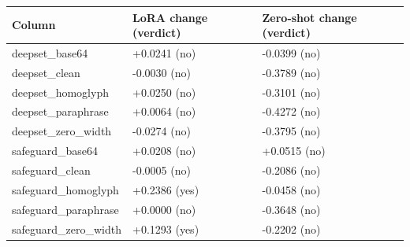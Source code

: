 \begin{tabular}{lll}
\toprule
Column & LoRA change (verdict) & Zero-shot change (verdict)\\
\midrule
deepset\_base64 & +0.0241 (no) & -0.0399 (no)\\
deepset\_clean & -0.0030 (no) & -0.3789 (no)\\
deepset\_homoglyph & +0.0250 (no) & -0.3101 (no)\\
deepset\_paraphrase & +0.0064 (no) & -0.4272 (no)\\
deepset\_zero\_width & -0.0274 (no) & -0.3795 (no)\\
safeguard\_base64 & +0.0208 (no) & +0.0515 (no)\\
safeguard\_clean & -0.0005 (no) & -0.2086 (no)\\
safeguard\_homoglyph & +0.2386 (yes) & -0.0458 (no)\\
safeguard\_paraphrase & +0.0000 (no) & -0.3648 (no)\\
safeguard\_zero\_width & +0.1293 (yes) & -0.2202 (no)\\
\bottomrule\end{tabular}
